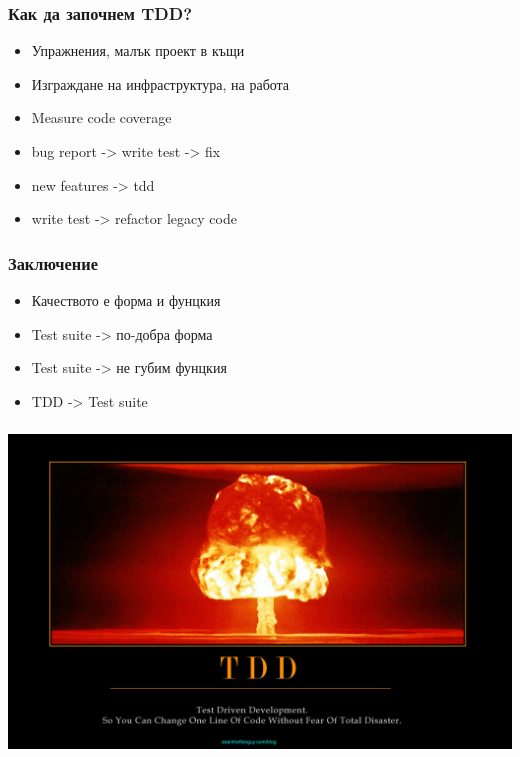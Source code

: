\begin{frame}
  \frametitle{Как да започнем TDD?}
  \pause
  \begin{itemize}
      \item Упражнения, малък проект в къщи\pause
      \item Изграждане на инфраструктура, на работа\pause
      \item Measure code coverage\pause
      \item bug report -> write test -> fix\pause
      \item new features -> tdd\pause
      \item write test -> refactor legacy code
  \end{itemize}
\end{frame}

\begin{frame}
  \frametitle{Заключение}
  \begin{itemize}
      \item Качеството е форма и фунцкия\pause
      \item Test suite -> по-добра форма\pause
      \item Test suite -> не губим фунцкия\pause
      \item TDD -> Test suite
  \end{itemize}
\end{frame}

\vspace*{-12.5mm}    
\begin{frame}
\frametitle{}
\hspace*{-11mm}
\includegraphics[width=\paperwidth, width=\paperwidth]{tdd.jpg}
\end{frame}

